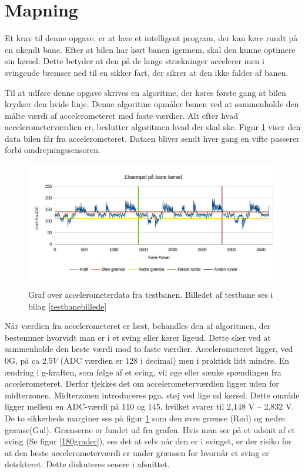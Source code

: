 \section{Mapning}
\label{mapning}
Et krav til denne opgave, er at lave et intelligent program, der kan køre rundt på en ukendt bane. Efter at bilen har kørt banen igennem, skal den kunne optimere sin kørsel. Dette betyder at den på de lange strækninger accelerer men i svingende bremser ned til en sikker fart, der sikrer at den ikke falder af banen.

Til at udføre denne opgave skrives en algoritme, der køres første gang at bilen krydser den hvide linje. Denne algoritme opmåler banen ved at sammenholde den målte værdi af accelerometeret med faste værdier. Alt efter hvad accelerometerværdien er, beslutter algoritmen hvad der skal ske.
Figur \ref{testbanegraf2} viser den data bilen får fra accelerometeret. Dataen bliver sendt hver gang en vifte passerer forbi omdrejningssensoren.\\

\begin{figure}[h!]
\centering
\includegraphics[scale=0.25]{./Graphics/banekorsel}
\caption{Graf over accelerometerdata fra testbanen. Billedet af testbane ses i bilag \ref{testbanebillede}}
\label{testbanegraf2}
\end{figure}

Når værdien fra accelerometeret er læst, behandles den af algoritmen, der bestemmer hvorvidt man er i et sving eller kører ligeud. Dette sker ved at sammenholde den læste værdi mod to faste værdier. Accelerometeret ligger, ved 0G, på ca $2.5 V$ (ADC værdien er 128 i decimal) men i praktisk lidt mindre. En ændring i g-kraften, som følge af et sving, vil øge eller sænke spændingen fra accelerometeret. Derfor tjekkes det om accelerometerværdien ligger uden for midterzonen. Midterzonen introduceres pga. støj ved lige ud kørsel. Dette område ligger mellem en ADC-værdi på 110 og 145, hvilket svarer til 2,148 V – 2,832 V. De to 
sikkerheds marginer ses på figur \ref{testbanegraf2} som den øvre grænse (Rød) og nedre grænse(Gul). Grænserne er fundet ud fra grafen.
Hvis man ser på et udsnit af et sving (Se figur \ref{180grader}), ses det at selv når den er i svinget, er der risiko for at den læste accelerometerværdi er under grænsen for hvornår et sving er detekteret. Dette diskuteres senere i afsnittet.\\

